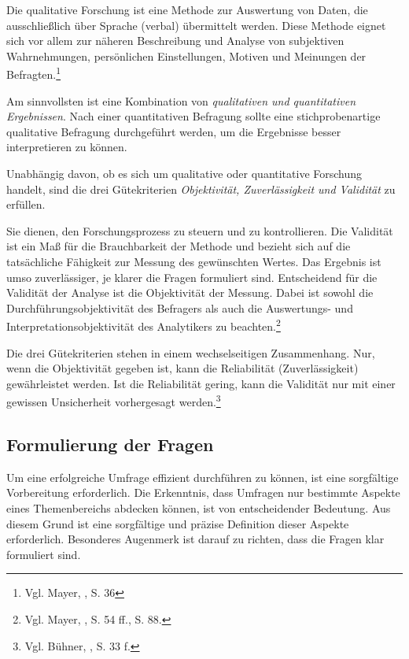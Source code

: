 

Die qualitative Forschung ist eine Methode zur Auswertung von Daten, die ausschließlich über Sprache (verbal) übermittelt
werden. Diese Methode eignet sich vor allem zur näheren Beschreibung und Analyse von subjektiven Wahrnehmungen, persönlichen
Einstellungen, Motiven und Meinungen der Befragten.\footnote{Vgl. Mayer, \cite{Interview und schriftliche Befragung}, S. 36}

Am sinnvollsten ist eine Kombination von \textit{qualitativen und quantitativen Ergebnissen}. Nach einer quantitativen
Befragung sollte eine stichprobenartige qualitative Befragung durchgeführt werden, um die Ergebnisse besser interpretieren zu können.

Unabhängig davon, ob es sich um qualitative oder quantitative Forschung handelt, sind die drei Gütekriterien \textit{Objektivität,
Zuverlässigkeit und Validität} zu erfüllen.

Sie dienen, den Forschungsprozess zu steuern und zu kontrollieren. Die Validität ist ein Maß für die Brauchbarkeit der
Methode und bezieht sich auf die tatsächliche Fähigkeit zur Messung des gewünschten Wertes. Das Ergebnis ist umso zuverlässiger,
je klarer die Fragen formuliert sind. Entscheidend für die Validität der Analyse ist die Objektivität der Messung. Dabei
ist sowohl die Durchführungsobjektivität des Befragers als auch die Auswertungs- und Interpretationsobjektivität des
Analytikers zu beachten.\footnote{Vgl. Mayer, \cite{Interview und schriftliche Befragung}, S. 54 ff., S. 88.}

Die drei Gütekriterien stehen in einem wechselseitigen Zusammenhang. Nur, wenn die Objektivität gegeben ist, kann die
Reliabilität (Zuverlässigkeit) gewährleistet werden. Ist die Reliabilität gering, kann die Validität nur mit einer gewissen Unsicherheit
vorhergesagt werden.\footnote{Vgl. Bühner, \cite{Einfuehrung in die Test- und Fragebogenkonstruktion}, S. 33 f.}

\subsection{Formulierung der Fragen}
Um eine erfolgreiche Umfrage effizient durchführen zu können, ist eine sorgfältige Vorbereitung erforderlich. Die
Erkenntnis, dass Umfragen nur bestimmte Aspekte eines Themenbereichs abdecken können, ist von entscheidender Bedeutung.
Aus diesem Grund ist eine sorgfältige und präzise Definition dieser Aspekte erforderlich. Besonderes Augenmerk ist darauf
zu richten, dass die Fragen klar formuliert sind.

